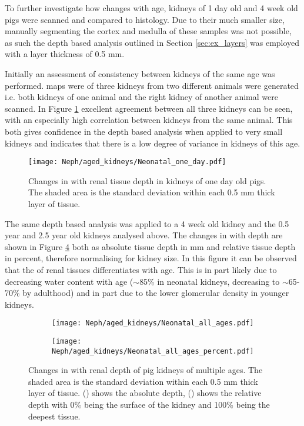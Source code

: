To further investigate how \tone changes with age, kidneys of 1 day old and 4 week old pigs were scanned and compared to histology. Due to their much smaller size, manually segmenting the cortex and medulla of these samples was not possible, as such the depth based analysis outlined in Section \ref{sec:ex_layers} was employed with a layer thickness of 0.5 mm. 

Initially an assessment of consistency between kidneys of the same age was performed. \tone maps were of three kidneys from two different animals were generated i.e. both kidneys of one animal and the right kidney of another animal were scanned. In Figure \ref{fig:ex_neo_layers_one_day} excellent agreement between all three kidneys can be seen, with an especially high correlation between kidneys from the same animal. This both gives confidence in the depth based analysis when applied to very small kidneys and indicates that there is a low degree of variance in kidneys of this age.

\begin{figure}[H]
	\centering
	\texttt{[image: Neph/aged\_kidneys/Neonatal\_one\_day.pdf]}
	\caption{Changes in \tone with renal tissue depth in kidneys of one day old pigs. The shaded area is the standard deviation within each 0.5 mm thick layer of tissue.}
	\label{fig:ex_neo_layers_one_day}	
\end{figure}

The same depth based analysis was applied to a 4 week old kidney and the 0.5 year and 2.5 year old kidneys analysed above. The changes in \tone with depth are shown in Figure \ref{fig:ex_neo_layers_all_ages} both as absolute tissue depth in mm and relative tissue depth in percent, therefore normalising for kidney size. In this figure it can be observed that the \tone of renal tissues differentiates with age. This is in part likely due to decreasing water content with age ($\sim$85\% in neonatal kidneys, decreasing to $\sim$65-70\% by adulthood) and in part due to the lower glomerular density in younger kidneys.

\begin{figure}[H]
	\centering
	\begin{subfigure}[c]{0.47\textwidth}
		\centering
		\texttt{[image: Neph/aged\_kidneys/Neonatal\_all\_ages.pdf]}
		\caption{}
		\label{fig:ex_neo_layers_all_ages_abs}
	\end{subfigure}
	\hfill
	\begin{subfigure}[c]{0.47\textwidth}
		\centering
		\texttt{[image: Neph/aged\_kidneys/Neonatal\_all\_ages\_percent.pdf]}
		\caption{}
		\label{fig:ex_neo_layers_all_ages_per}
	\end{subfigure}
	\caption{Changes in \tone with renal depth of pig kidneys of multiple ages. The shaded area is the standard deviation within each 0.5 mm thick layer of tissue. () shows the absolute depth, () shows the relative depth with 0\% being the surface of the kidney and 100\% being the deepest tissue.}
	\label{fig:ex_neo_layers_all_ages}
\end{figure}

